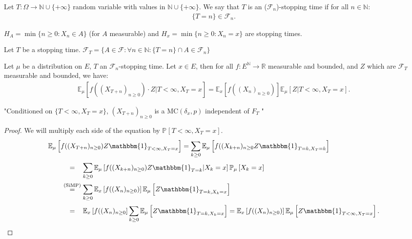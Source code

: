 \begin{defn}
	Let $T:\Omega \to \mathbb{N} \cup \{+\infty\}$ random variable with values in $\mathbb{N}\cup\{+\infty\}$. We say that $T$ is an ($ \mathcal{F}_n$)-stopping time if for all $n \in \mathbb{N}$:
	\begin{align}
		\{T=n\} \in \mathcal{F}_n
	.\end{align}
\end{defn}

\begin{ex}
	$H_{A}=\min\{n \geq 0: X_n \in  A\}$ (for $A$ measurable) and $H_x=\min\{n\geq 0: X_n = x\}$ are stopping times.
\end{ex}

\begin{defn}
	Let $T$ be a stopping time. $ \mathcal{F}_T=\{A \in \mathcal{F}: \forall n \in \mathbb{N}: \{T=n\}\cap A \in \mathcal{F}_n \}$
\end{defn}

\begin{theorem}
	Let $\mu $ be a distribution on $E$, $T$ an $ \mathcal{F}_n$-stopping time. Let $x \in E$,
	then for all $f:E^{\mathbb{N}} \to \mathbb{R}$ measurable and bounded, and $Z$ which are $ \mathcal{F}_T$ measurable and bounded, we have:
\begin{align}
	\boxed{ \mathbb{E}_{\mu } \left[ f((X_{T+n})_{n\geq 0}) \cdot Z | T<\infty, X_T=x \right] = \mathbb{E}_{x} \left[ f((X_n)_{n\geq 0}) \right]  \mathbb{E}_{\mu } \left[ Z | T<\infty, X_T=x \right]} 
.\end{align}
\end{theorem}
\noindent
"Conditioned on $\{T<\infty,X_T=x\}$, $(X_{T+n})_{n\geq 0}$ is a $ \textrm{MC}(\delta_x,p)$ independent of $F_T$ "
\begin{proof}
We will multiply each side of the equation by $\mathbb{P}_{} \left[ T < \infty, X_T =x \right]$.
\begin{align}
&	\mathbb{E}_{\mu } \left[ f((X_{T+n})_{n\geq 0})Z \mathbbm{1}_{T<\infty, X_T=x}  \right] =
		\sum_{k\geq 0}^{} \mathbb{E}_{\mu } \left[ f((X_{k+n})_{n\geq 0} Z \mathbbm{1}_{T=k, X_T=k}  \right] \\
&\qquad	\stackrel{\phantom{\text{(SiMP)}}}{=}  \sum_{k\geq 0}^{} \mathbb{E}_{\mu } \left[ f((X_{k+n})_{n\geq 0}) Z \mathbbm{1}_{T=k} | X_k = x \right] \mathbb{P}_{\mu } \left[ X_k = x  \right] \\ 
&\qquad	\stackrel{\text{(SiMP)}}{=} \sum_{k\geq 0}^{} \mathbb{E}_{x} \left[ f((X_{n})_{n\geq 0}) \right] \mathbb{E}_{\mu } \left[ Z \mathbbm{1}_{T=k, X_k = x}  \right] \\
&\qquad	\stackrel{\phantom{\text{(SiMP)}}}{=} \mathbb{E}_{x} \left[ f((X_n)_{n\geq 0} \right] \sum_{k\geq 0}^{} \mathbb{E}_{\mu } \left[ Z \mathbbm{1}_{T=k, X_k=x}  \right]  
		= \mathbb{E}_{x} \left[ f((X_n)_{n\geq 0}) \right] \mathbb{E}_{\mu } \left[ Z \mathbbm{1}_{T<\infty, X_T=x}  \right] 
.\end{align}
\end{proof}


